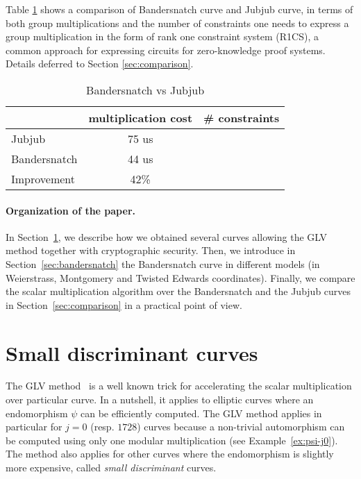 \documentclass{article}
\theoremstyle{definition}
\begin{document}
Table \ref{tab:comp} shows a comparison of Bandersnatch curve
and Jubjub curve, in terms of both group multiplications and 
the number of constraints one needs to express a group multiplication
in the form of rank one constraint system (R1CS), 
a common approach for expressing circuits for zero-knowledge 
proof systems. Details deferred to Section \ref{sec:comparison}.

\begin{table}[h] %
  \centering
  
  \begin{tabular}{|l|c|c|}\hline
      & multiplication cost & \# constraints \\\hline\hline
    Jubjub & 75 us & \\\hline
    Bandersnatch & 44 us &  \\\hline\hline   
    Improvement & 42\% & \\\hline
  \end{tabular}
  \caption{Bandersnatch vs Jubjub}
  \label{tab:comp}
\end{table}



\paragraph{Organization of the paper.}
In Section~\ref{sec:small-disc-curves}, we describe how we obtained
several curves allowing the GLV method together with cryptographic
security.
Then, we introduce in Section~\ref{sec:bandersnatch} the Bandersnatch
curve in different models (in Weierstrass, Montgomery and Twisted Edwards
coordinates).
Finally, we compare the scalar multiplication algorithm over
the Bandersnatch and the Jubjub curves in
Section~\ref{sec:comparison} in a practical point of view.


\section{Small discriminant curves}\label{sec:small-disc-curves}

The GLV method~\cite{C:GalLamVan01} is a well known trick for accelerating the
scalar multiplication over particular curve. In a nutshell, it applies
to elliptic curves where an endomorphism $\psi$ can be efficiently computed.
The GLV method applies in particular for $j=0$ (resp. $1728$) curves
because a non-trivial automorphism can be computed using only one
modular multiplication (see Example~\ref{ex:psi-j0}).
The method also applies for other curves where the endomorphism is
slightly more expensive, called \emph{small discriminant} curves.
\end{document}
